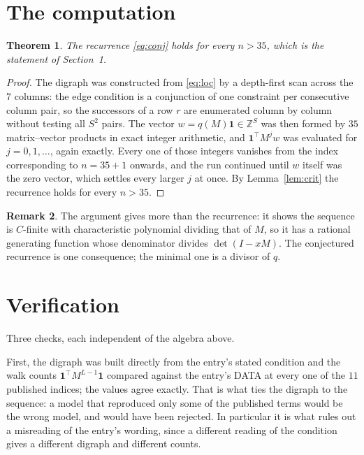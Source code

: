 \documentclass[11pt,a4paper]{article}
\theoremstyle{plain}
\newtheorem{theorem}{Theorem}
\theoremstyle{definition}
\newtheorem{remark}[theorem]{Remark}
\begin{document}
\section{The computation}

\begin{theorem}
The recurrence \eqref{eq:conj} holds for every $n>35$, which is the statement of
Section~1.
\end{theorem}

\begin{proof}
The digraph was constructed from \eqref{eq:loc} by a depth-first scan across the $7$
columns: the edge condition is a conjunction of one constraint per consecutive column
pair, so the successors of a row $r$ are enumerated column by column without testing all
$S^2$ pairs. The vector $w=q(M)\mathbf{1}\in\mathbb{Z}^{S}$ was then formed by $35$
matrix--vector products in exact integer arithmetic, and $\mathbf{1}^{\!\top}M^{j}w$ was
evaluated for $j=0,1,\dots$, again exactly. Every one of those integers vanishes from the
index corresponding to $n=35+1$ onwards, and the run continued until $w$ itself was the
zero vector, which settles every larger $j$ at once. By Lemma~\ref{lem:crit} the recurrence
holds for every $n>35$.
\end{proof}

\begin{remark}
The argument gives more than the recurrence: it shows the sequence is $C$-finite with
characteristic polynomial dividing that of $M$, so it has a rational generating function
whose denominator divides $\det(I-xM)$. The conjectured recurrence is one consequence; the
minimal one is a divisor of $q$.
\end{remark}

\section{Verification}

Three checks, each independent of the algebra above.

First, the digraph was built directly from the entry's stated condition and the walk counts
$\mathbf{1}^{\!\top}M^{L-1}\mathbf{1}$ compared against the entry's DATA at
every one of the $11$ published indices; the values agree exactly. That is what ties
the digraph to the sequence: a model that reproduced only some of the published terms would
be the wrong model, and would have been rejected. In particular it is what rules out a
misreading of the entry's wording, since a different reading of the condition gives a
different digraph and different counts.
\end{document}
